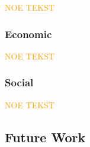 \textcolor{orange}{NOE TEKST}

\subsubsection{Economic}

\textcolor{orange}{NOE TEKST}

\subsubsection{Social}

\textcolor{orange}{NOE TEKST}

\subsection{Future Work}

